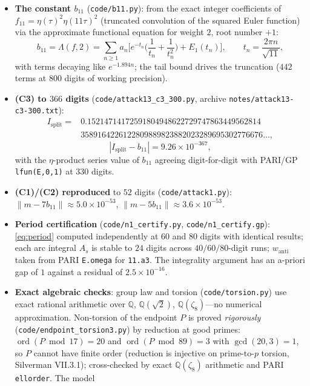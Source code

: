 \documentclass[11pt]{amsart}
\theoremstyle{definition}
\theoremstyle{remark}
\newcommand{\Q}{\mathbb{Q}}
\begin{document}
\begin{itemize}
  \item \textbf{The constant $b_{11}$} (\texttt{code/b11.py}): from the exact
  integer coefficients of $f_{11}=\eta(\tau)^2\eta(11\tau)^2$ (truncated
  convolution of the squared Euler function) via the approximate functional
  equation for weight $2$, root number $+1$:
  \[
    b_{11}=\Lambda(f,2)=\sum_{n\ge1}a_n\Big[e^{-t_n}\Big(\frac1{t_n}
    +\frac1{t_n^2}\Big)+E_1(t_n)\Big],\qquad t_n=\frac{2\pi n}{\sqrt{11}},
  \]
  with terms decaying like $e^{-1.894n}$; the tail bound drives the
  truncation ($442$ terms at $800$ digits of working precision).
  \item \textbf{(C3) to $366$ digits} (\texttt{code/attack13\_c3\_300.py},
  archive \texttt{notes/attack13-c3-300.txt}):
  {\small
  \[
  \begin{aligned}
    I_{\mathrm{split}}
    ={}&0.15214714172591804948622729747863449562814\\
       &3589164226122809889823882023289695302776676\ldots,
  \end{aligned}
  \]}
  \[
    |I_{\mathrm{split}}-b_{11}|=9.26\times10^{-367},
  \]
  with the $\eta$-product series value of $b_{11}$ agreeing digit-for-digit
  with PARI/GP \texttt{lfun(E,0,1)} at $330$ digits.
  \item \textbf{(C1)/(C2) reproduced} to $52$ digits
  (\texttt{code/attack1.py}): $\|m-7b_{11}\|\approx5.0\times10^{-53}$,
  $\|m-5b_{11}\|\approx3.6\times10^{-53}$.
  \item \textbf{Period certification} (\texttt{code/n1\_certify.py},
  \texttt{code/n1\_certify.gp}): \eqref{eq:period} computed independently at
  $60$ and $80$ digits with identical results; each arc integral $A_s$ is
  stable to $24$ digits across $40/60/80$-digit runs; $w_{\mathrm{anti}}$
  taken from PARI \texttt{E.omega} for \texttt{11.a3}. The integrality
  argument has an a-priori gap of $1$ against a residual of
  $2.5\times10^{-16}$.
  \item \textbf{Exact algebraic checks}: group law and torsion
  (\texttt{code/torsion.py}) use exact
  rational arithmetic over $\Q$, $\Q(\sqrt2)$, $\Q(\zeta_8)$---no numerical
  approximation. Non-torsion of the endpoint $P$ is proved \emph{rigorously}
  (\texttt{code/endpoint\_torsion3.py}) by reduction at good primes:
  $\operatorname{ord}(P\bmod 17)=20$ and $\operatorname{ord}(P\bmod 89)=3$
  with $\gcd(20,3)=1$, so $P$ cannot have finite order (reduction is
  injective on prime-to-$p$ torsion, Silverman VII.3.1); cross-checked by
  exact $\Q(\zeta_8)$ arithmetic and PARI \texttt{ellorder}. The model

\end{itemize}
\end{document}
